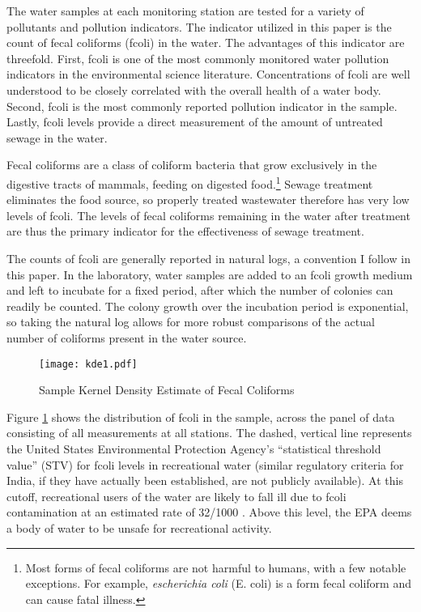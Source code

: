 \documentclass[12pt]{article}
\begin{document}
The water samples at each monitoring station are tested for a variety of pollutants and pollution indicators. The indicator utilized in this paper is the count of fecal coliforms (fcoli) in the water. The advantages of this indicator are threefold. First, fcoli is one of the most commonly monitored water pollution indicators in the environmental science literature. Concentrations of fcoli are well understood to be closely correlated with the overall health of a water body. Second, fcoli is the most commonly reported pollution indicator in the sample. Lastly, fcoli levels provide a direct measurement of the amount of untreated sewage in the water.

Fecal coliforms are a class of coliform bacteria that grow exclusively in the digestive tracts of mammals, feeding on digested food.\footnote{Most forms of fecal coliforms are not harmful to humans, with a few notable exceptions. For example, \textit{escherichia coli} (E. coli) is a form fecal coliform and can cause fatal illness.} Sewage treatment eliminates the food source, so properly treated wastewater therefore has very low levels of fcoli. The levels of fecal coliforms remaining in the water after treatment are thus the primary indicator for the effectiveness of sewage treatment. 

The counts of fcoli are generally reported in natural logs, a convention I follow in this paper. In the laboratory, water samples are added to an fcoli growth medium and left to incubate for a fixed period, after which the number of colonies can readily be counted. The colony growth over the incubation period is exponential, so taking the natural log allows for more robust comparisons of the actual number of coliforms present in the water source. 

\begin{figure}[t]
  \centering
  \texttt{[image: kde1.pdf]}
  \caption{Sample Kernel Density Estimate of Fecal Coliforms}
  \label{fig:kde}
\end{figure}


Figure \ref{fig:kde} shows the distribution of fcoli in the sample, across the panel of data consisting of all measurements at all stations. The dashed, vertical line represents the United States Environmental Protection Agency's ``statistical threshold value'' (STV) for fcoli levels in recreational water (similar regulatory criteria for India, if they have actually been established, are not publicly available). At this cutoff, recreational users of the water are likely to fall ill due to fcoli contamination at an estimated rate of 32/1000 . Above this level, the EPA deems a body of water to be unsafe for recreational activity.
\end{document}
